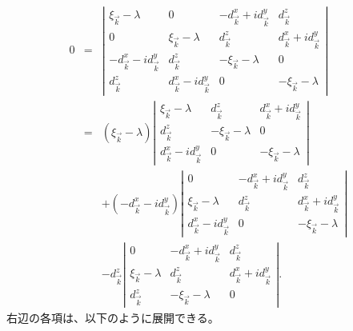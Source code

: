 \documentclass[uplatex,a4j,12pt,dvipdfmx]{jsarticle}
\begin{document}
\begin{eqnarray}
	0
	&=&
	\left|
	\begin{array}{cccc}
		{\xi_{\vec{k}}} - \lambda                & 0                                      & - {d^{x}_{\vec{k}}} + i{d^{y}_{\vec{k}}} & {d^{z}_{\vec{k}}}                      \\[2mm]
		0                                        & {\xi_{\vec{k}}} - \lambda              & {d^{z}_{\vec{k}}}                        & {d^{x}_{\vec{k}}} + i{d^{y}_{\vec{k}}} \\[2mm]
		- {d^{x}_{\vec{k}}} - i{d^{y}_{\vec{k}}} & {d^{z}_{\vec{k}}}                      & - {\xi_{\vec{k}}} -\lambda               & 0                                      \\[2mm]
		{d^{z}_{\vec{k}}}                        & {d^{x}_{\vec{k}}} - i{d^{y}_{\vec{k}}} & 0                                        & - {\xi_{\vec{k}}} -\lambda
	\end{array}
	\right|
	\nonumber \\[3mm] &=&
	({\xi_{\vec{k}}} - \lambda)
	\left|
	\begin{array}{ccc}
		{\xi_{\vec{k}}} - \lambda              & {d^{z}_{\vec{k}}}          & {d^{x}_{\vec{k}}} + i{d^{y}_{\vec{k}}} \\[2mm]
		{d^{z}_{\vec{k}}}                      & - {\xi_{\vec{k}}} -\lambda & 0                                      \\[2mm]
		{d^{x}_{\vec{k}}} - i{d^{y}_{\vec{k}}} & 0                          & - {\xi_{\vec{k}}} -\lambda
	\end{array}
	\right|
	\nonumber \\[3mm] && +
	(- {d^{x}_{\vec{k}}} - i{d^{y}_{\vec{k}}})
	\left|
	\begin{array}{ccc}
		0                                      & - {d^{x}_{\vec{k}}} + i{d^{y}_{\vec{k}}} & {d^{z}_{\vec{k}}}                      \\[2mm]
		{\xi_{\vec{k}}} - \lambda              & {d^{z}_{\vec{k}}}                        & {d^{x}_{\vec{k}}} + i{d^{y}_{\vec{k}}} \\[2mm]
		{d^{x}_{\vec{k}}} - i{d^{y}_{\vec{k}}} & 0                                        & - {\xi_{\vec{k}}} -\lambda
	\end{array}
	\right|
	\nonumber \\[3mm] && -
	{d^{z}_{\vec{k}}}
	\left|
	\begin{array}{ccc}
		0                         & - {d^{x}_{\vec{k}}} + i{d^{y}_{\vec{k}}} & {d^{z}_{\vec{k}}}                      \\[2mm]
		{\xi_{\vec{k}}} - \lambda & {d^{z}_{\vec{k}}}                        & {d^{x}_{\vec{k}}} + i{d^{y}_{\vec{k}}} \\[2mm]
		{d^{z}_{\vec{k}}}         & - {\xi_{\vec{k}}} -\lambda               & 0
	\end{array}
	\right|
	.
\end{eqnarray}
%
右辺の各項は、以下のように展開できる。
\end{document}
